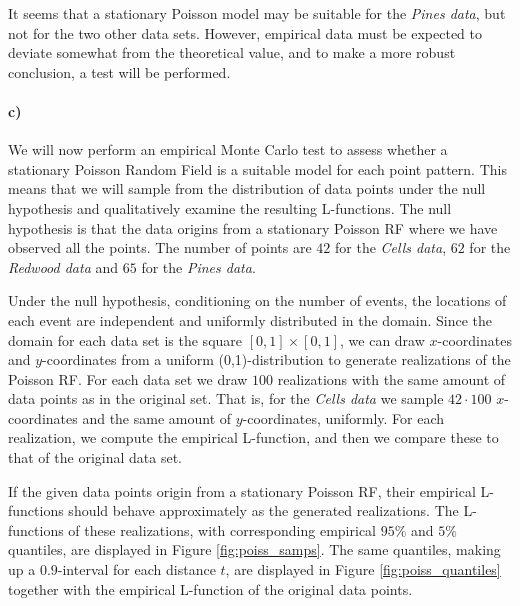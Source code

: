 It seems that a stationary Poisson model may be suitable for the \textit{Pines data}, but not for the two other data sets. However, empirical data must be expected to deviate somewhat from the theoretical value, and to make a more robust conclusion, a test will be performed.

\paragraph{c)}
We will now perform an empirical Monte Carlo test to assess whether a stationary Poisson Random Field is a suitable model for each point pattern. This means that we will sample from the distribution of data points under the null hypothesis and qualitatively examine the resulting L-functions. The null hypothesis is that the data origins from a stationary Poisson RF where we have observed all the points. The number of points are $42$ for the \textit{Cells data}, $62$ for the \textit{Redwood data} and $65$ for the \textit{Pines data}.

Under the null hypothesis, conditioning on the number of events, the locations of each event are independent and uniformly distributed in the domain. Since the domain for each data set is the square $[0,1] \times [0,1]$, we can draw $x$-coordinates and $y$-coordinates from a uniform (0,1)-distribution to generate realizations of the Poisson RF. For each data set we draw $100$ realizations with the same amount of data points as in the original set. That is, for the \textit{Cells data} we sample $42\cdot 100$ $x$-coordinates and the same amount of $y$-coordinates, uniformly. For each realization, we compute the empirical L-function, and then we compare these to that of the original data set.

If the given data points origin from a stationary Poisson RF, their empirical L-functions should behave approximately as the generated realizations. The L-functions of these realizations, with corresponding empirical $95\%$ and $5\%$ quantiles, are displayed in Figure \ref{fig:poiss_samps}. The same quantiles, making up a $0.9$-interval for each distance $t$, are displayed in Figure \ref{fig:poiss_quantiles} together with the empirical L-function of the original data points.

